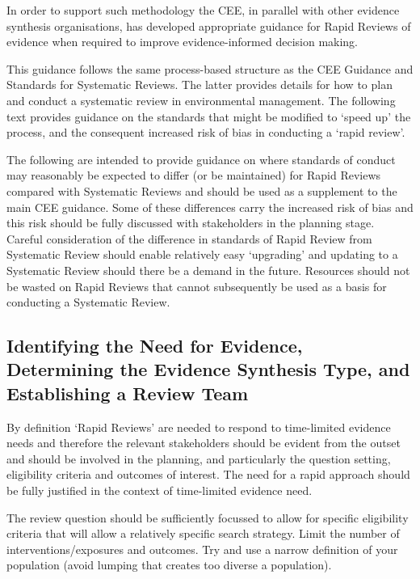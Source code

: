 \documentclass[
  letterpaper,
  DIV=11,
  numbers=noendperiod]{scrreprt}
\begin{document}
In order to support such methodology the CEE, in parallel with other
evidence synthesis organisations, has developed appropriate guidance for
Rapid Reviews of evidence when required to improve evidence-informed
decision making.

This guidance follows the same process-based structure as the CEE
Guidance and Standards for Systematic Reviews. The latter provides
details for how to plan and conduct a systematic review in environmental
management. The following text provides guidance on the standards that
might be modified to `speed up' the process, and the consequent
increased risk of bias in conducting a `rapid review'.

The following are intended to provide guidance on where standards of
conduct may reasonably be expected to differ (or be maintained) for
Rapid Reviews compared with Systematic Reviews and should be used as a
supplement to the main CEE guidance. Some of these differences carry the
increased risk of bias and this risk should be fully discussed with
stakeholders in the planning stage.\\
Careful consideration of the difference in standards of Rapid Review
from Systematic Review should enable relatively easy `upgrading' and
updating to a Systematic Review should there be a demand in the future.
Resources should not be wasted on Rapid Reviews that cannot subsequently
be used as a basis for conducting a Systematic Review.

\subsection{Identifying the Need for Evidence, Determining the Evidence
Synthesis Type, and Establishing a Review
Team}\label{identifying-the-need-for-evidence-determining-the-evidence-synthesis-type-and-establishing-a-review-team-1}

By definition `Rapid Reviews' are needed to respond to time-limited
evidence needs and therefore the relevant stakeholders should be evident
from the outset and should be involved in the planning, and particularly
the question setting, eligibility criteria and outcomes of interest. The
need for a rapid approach should be fully justified in the context of
time-limited evidence need.

The review question should be sufficiently focussed to allow for
specific eligibility criteria that will allow a relatively specific
search strategy. Limit the number of interventions/exposures and
outcomes. Try and use a narrow definition of your population (avoid
lumping that creates too diverse a population).
\end{document}
